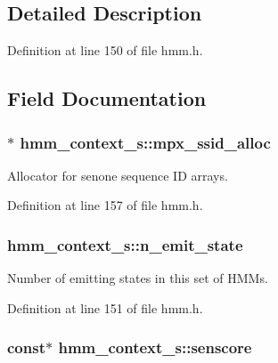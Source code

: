 \subsection{\-Detailed \-Description}


\-Definition at line 150 of file hmm.\-h.



\subsection{\-Field \-Documentation}
\subsubsection[{mpx\-\_\-ssid\-\_\-alloc}]{$\ast$ {\bf hmm\-\_\-context\-\_\-s\-::mpx\-\_\-ssid\-\_\-alloc}}\label{structhmm__context__s_a63486d186a984a87d060064e65fab564}


\-Allocator for senone sequence \-I\-D arrays. 



\-Definition at line 157 of file hmm.\-h.

\subsubsection[{n\-\_\-emit\-\_\-state}]{ {\bf hmm\-\_\-context\-\_\-s\-::n\-\_\-emit\-\_\-state}}\label{structhmm__context__s_a27ba4c5db11110bddf240dd52ed36084}


\-Number of emitting states in this set of \-H\-M\-Ms. 



\-Definition at line 151 of file hmm.\-h.

\subsubsection[{senscore}]{ const$\ast$ {\bf hmm\-\_\-context\-\_\-s\-::senscore}}\label{structhmm__context__s_a1cca9eb94bc20d9c5e60f2da18074397}


